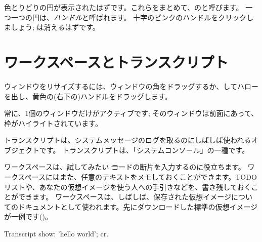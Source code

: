 \documentclass[a4paper,10pt,twoside]{book}
\begin{document}
色とりどりの円が表示されたはずです。これらをまとめて、\bam のと呼びます。
一つ一つの円は、\emph{ハンドル}と呼ばれます。
十字のピンクのハンドルをクリックしましょう; \bam は消えるはずです。

\section{ワークスペースとトランスクリプト}


ウィンドウをリサイズするには、ウィンドウの角をドラッグするか、\metaclick してハローを出し、黄色の(右下の)ハンドルをドラッグします。

常に、1個のウィンドウだけがアクティブです; そのウィンドウは前面にあって、枠がハイライトされています。

トランスクリプトは、システムメッセージのログを取るのにしばしば使われるオブジェクトです。
トランスクリプトは、「システムコンソール」の一種です。

ワークスペースは、試してみたい \st コードの断片を入力するのに役立ちます。
ワークスペースにはまた、任意のテキストをメモしておくことができます。TODO リストや、あなたの仮想イメージを使う人への手引きなどを、書き残しておくことができます。
ワークスペースは、しばしば、保存された仮想イメージについてのドキュメントとして使われます。先にダウンロードした標準の仮想イメージが一例です()。

\begin{code}{}
Transcript show: 'hello world'; cr.
\end{code}
\end{document}
